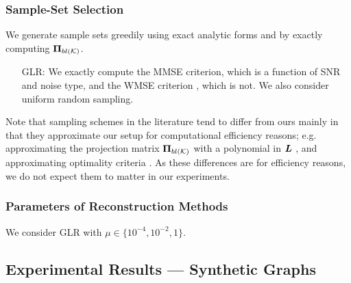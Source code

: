 \subsubsection{Sample-Set Selection}

We generate sample sets greedily using exact analytic forms and by exactly computing $\bm{\Pi}_{bl(\mathcal{K})}$.
\begin{itemize}
    \item[GLR:] We exactly compute the MMSE criterion, which is a function of SNR and noise type, and the WMSE criterion {\color{black}\cite{EOptimalChen}}, which is not. We also consider uniform random sampling.
\end{itemize}
Note that sampling schemes in the literature tend to differ from ours mainly in that they approximate our setup for computational efficiency reasons; e.g. approximating the projection matrix $\projbl$ with a polynomial in $\bm{L}$ \cite{wang2018optimal}, and approximating optimality criteria \cite{bai2020fast}. As these differences are for efficiency reasons, we do not expect them to matter in our experiments.

\subsubsection{Parameters of Reconstruction Methods} We consider GLR with $\mu \in \{10^{-4}, 10^{-2}, 1 \}$.

\subsection{Experimental Results --- Synthetic Graphs}


